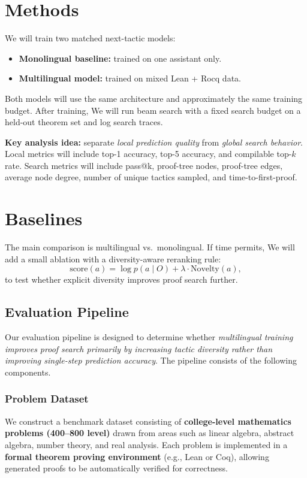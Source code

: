 \documentclass{article} %
\begin{document}
\section*{Methods}
We  will train two matched next-tactic models:
\begin{itemize}
    \item \textbf{Monolingual baseline:} trained on one assistant only.
    \item \textbf{Multilingual model:} trained on mixed Lean + Rocq data.
\end{itemize}
Both models will use the same architecture and approximately the same training budget. After training, We  will run beam search with a fixed search budget on a held-out theorem set and log search traces.

\textbf{Key analysis idea:} separate \emph{local prediction quality} from \emph{global search behavior}.  
Local metrics will include top-1 accuracy, top-5 accuracy, and compilable top-$k$ rate.  
Search metrics will include pass@k, proof-tree nodes, proof-tree edges, average node degree, number of unique tactics sampled, and time-to-first-proof.

\section*{Baselines}
The main comparison is multilingual vs.\ monolingual. If time permits, We  will add a small ablation with a diversity-aware reranking rule:
\[
\text{score}(a) = \log p(a \mid O) + \lambda \cdot \text{Novelty}(a),
\]
to test whether explicit diversity improves proof search further.

\subsection*{Evaluation Pipeline}

Our evaluation pipeline is designed to determine whether \textit{multilingual training improves proof search primarily by increasing tactic diversity rather than improving single-step prediction accuracy}. The pipeline consists of the following components.

\subsubsection*{Problem Dataset}

We construct a benchmark dataset consisting of \textbf{college-level mathematics problems (400--800 level)} drawn from areas such as linear algebra, abstract algebra, number theory, and real analysis. Each problem is implemented in a \textbf{formal theorem proving environment} (e.g., Lean or Coq), allowing generated proofs to be automatically verified for correctness.
\end{document}
